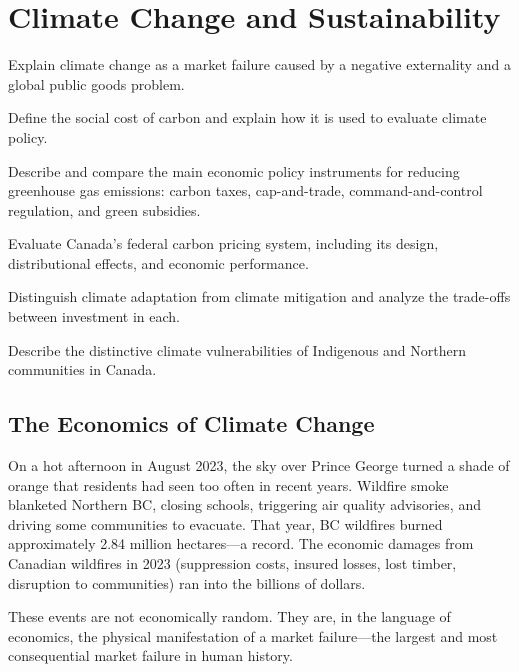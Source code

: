 
\chapter{Climate Change and Sustainability}
\label{ch:climate}

\begin{learningobjectives}
\item Explain climate change as a market failure caused by a negative externality and a global public goods problem.
\item Define the social cost of carbon and explain how it is used to evaluate climate policy.
\item Describe and compare the main economic policy instruments for reducing greenhouse gas emissions: carbon taxes, cap-and-trade, command-and-control regulation, and green subsidies.
\item Evaluate Canada's federal carbon pricing system, including its design, distributional effects, and economic performance.
\item Distinguish climate adaptation from climate mitigation and analyze the trade-offs between investment in each.
\item Describe the distinctive climate vulnerabilities of Indigenous and Northern communities in Canada.
\end{learningobjectives}

\section{The Economics of Climate Change}

On a hot afternoon in August 2023, the sky over Prince George turned a shade of orange that residents had seen too often in recent years. Wildfire smoke blanketed Northern BC, closing schools, triggering air quality advisories, and driving some communities to evacuate. That year, BC wildfires burned approximately 2.84 million hectares---a record. The economic damages from Canadian wildfires in 2023 (suppression costs, insured losses, lost timber, disruption to communities) ran into the billions of dollars.

These events are not economically random. They are, in the language of economics, the physical manifestation of a market failure---the largest and most consequential market failure in human history.

